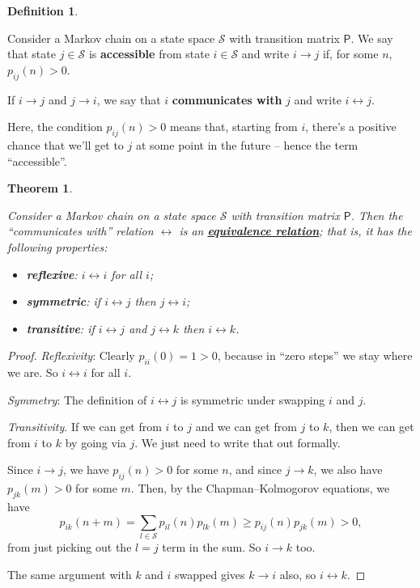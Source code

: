 \documentclass[
  a4paper,
]{article}
\providecommand{\tightlist}{%
  \setlength{\itemsep}{0pt}\setlength{\parskip}{0pt}}
\newtheorem{theorem}{Theorem}[section]
\theoremstyle{definition}
\newtheorem{definition}{Definition}[section]
\theoremstyle{definition}
\theoremstyle{definition}
\theoremstyle{remark}
\begin{document}
\begin{definition}
\protect\hypertarget{def:comm}{}\label{def:comm}

Consider a Markov chain on a state space \(\mathcal S\) with transition matrix \(\mathsf P\). We say that state \(j\in\mathcal{S}\) is \textbf{accessible} from state \(i\in\mathcal{S}\) and write \(i \to j\) if, for some \(n\), \(p_{ij}(n)>0\).

If \(i \to j\) and \(j \to i\), we say that \(i\) \textbf{communicates with} \(j\) and write \(i \leftrightarrow j\).

\end{definition}

Here, the condition \(p_{ij}(n)>0\) means that, starting from \(i\), there's a positive chance that we'll get to \(j\) at some point in the future -- hence the term ``accessible''.

\begin{theorem}
\protect\hypertarget{thm:equiv-rel}{}\label{thm:equiv-rel}

Consider a Markov chain on a state space \(\mathcal S\) with transition matrix \(\mathsf P\). Then the ``communicates with'' relation \(\leftrightarrow\) is an \href{https://en.wikipedia.org/wiki/Equivalence_relation}{\textbf{equivalence relation}}; that is, it has the following properties:

\begin{itemize}
\tightlist
\item
  \textbf{reflexive}: \(i \leftrightarrow i\) for all \(i\);
\item
  \textbf{symmetric}: if \(i \leftrightarrow j\) then \(j \leftrightarrow i\);
\item
  \textbf{transitive}: if \(i \leftrightarrow j\) and \(j \leftrightarrow k\) then \(i \leftrightarrow k\).
\end{itemize}

\end{theorem}

\begin{proof}

\emph{Reflexivity}: Clearly \(p_{ii}(0) = 1 > 0\), because in ``zero steps'' we stay where we are. So \(i \leftrightarrow i\) for all \(i\).

\emph{Symmetry}: The definition of \(i \leftrightarrow j\) is symmetric under swapping \(i\) and \(j\).

\emph{Transitivity}. If we can get from \(i\) to \(j\) and we can get from \(j\) to \(k\), then we can get from \(i\) to \(k\) by going via \(j\). We just need to write that out formally.

Since \(i \to j\), we have \(p_{ij}(n) > 0\) for some \(n\), and since \(j \to k\), we also have \(p_{jk}(m) > 0\) for some \(m\). Then, by the Chapman--Kolmogorov equations, we have
\[ p_{ik}(n+m) = \sum_{l \in \mathcal S} p_{il}(n) p_{lk}(m) \geq p_{ij}(n) p_{jk}(m) > 0 , \]
from just picking out the \(l=j\) term in the sum. So \(i \to k\) too.

The same argument with \(k\) and \(i\) swapped gives \(k \to i\) also, so \(i \leftrightarrow k\).

\end{proof}
\end{document}
